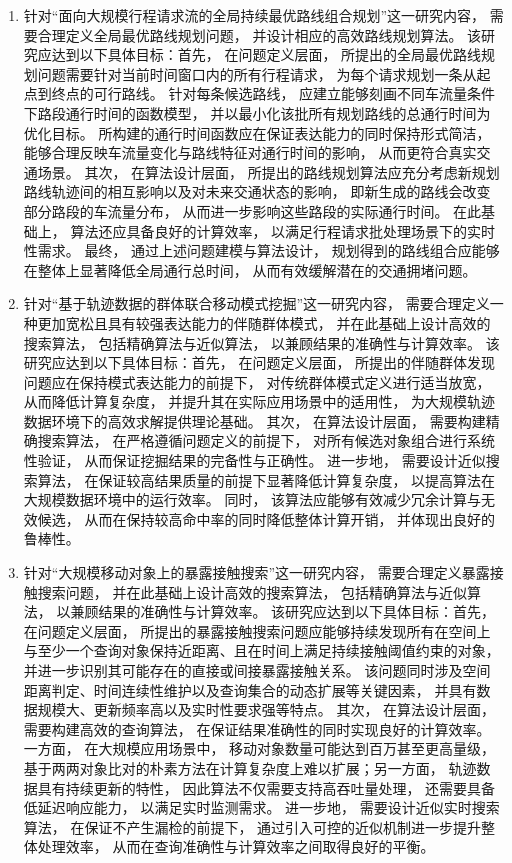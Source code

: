 \begin{enumerate}
    \item 针对“面向大规模行程请求流的全局持续最优路线组合规划”这一研究内容， 需要合理定义全局最优路线规划问题， 并设计相应的高效路线规划算法。 该研究应达到以下具体目标：首先， 在问题定义层面， 所提出的全局最优路线规划问题需要针对当前时间窗口内的所有行程请求， 为每个请求规划一条从起点到终点的可行路线。 针对每条候选路线， 应建立能够刻画不同车流量条件下路段通行时间的函数模型， 并以最小化该批所有规划路线的总通行时间为优化目标。 所构建的通行时间函数应在保证表达能力的同时保持形式简洁， 能够合理反映车流量变化与路线特征对通行时间的影响， 从而更符合真实交通场景。 其次， 在算法设计层面， 所提出的路线规划算法应充分考虑新规划路线轨迹间的相互影响以及对未来交通状态的影响， 即新生成的路线会改变部分路段的车流量分布， 从而进一步影响这些路段的实际通行时间。 在此基础上， 算法还应具备良好的计算效率， 以满足行程请求批处理场景下的实时性需求。 最终， 通过上述问题建模与算法设计， 规划得到的路线组合应能够在整体上显著降低全局通行总时间， 从而有效缓解潜在的交通拥堵问题。

    \item 针对“基于轨迹数据的群体联合移动模式挖掘”这一研究内容， 需要合理定义一种更加宽松且具有较强表达能力的伴随群体模式， 并在此基础上设计高效的搜索算法， 包括精确算法与近似算法， 以兼顾结果的准确性与计算效率。 该研究应达到以下具体目标：首先， 在问题定义层面， 所提出的伴随群体发现问题应在保持模式表达能力的前提下， 对传统群体模式定义进行适当放宽， 从而降低计算复杂度， 并提升其在实际应用场景中的适用性， 为大规模轨迹数据环境下的高效求解提供理论基础。 其次， 在算法设计层面， 需要构建精确搜索算法， 在严格遵循问题定义的前提下， 对所有候选对象组合进行系统性验证， 从而保证挖掘结果的完备性与正确性。 进一步地， 需要设计近似搜索算法， 在保证较高结果质量的前提下显著降低计算复杂度， 以提高算法在大规模数据环境中的运行效率。 同时， 该算法应能够有效减少冗余计算与无效候选， 从而在保持较高命中率的同时降低整体计算开销， 并体现出良好的鲁棒性。

    \item 针对“大规模移动对象上的暴露接触搜索”这一研究内容， 需要合理定义暴露接触搜索问题， 并在此基础上设计高效的搜索算法， 包括精确算法与近似算法， 以兼顾结果的准确性与计算效率。 该研究应达到以下具体目标：首先， 在问题定义层面， 所提出的暴露接触搜索问题应能够持续发现所有在空间上与至少一个查询对象保持近距离、且在时间上满足持续接触阈值约束的对象， 并进一步识别其可能存在的直接或间接暴露接触关系。 该问题同时涉及空间距离判定、时间连续性维护以及查询集合的动态扩展等关键因素， 并具有数据规模大、更新频率高以及实时性要求强等特点。 其次， 在算法设计层面， 需要构建高效的查询算法， 在保证结果准确性的同时实现良好的计算效率。 一方面， 在大规模应用场景中， 移动对象数量可能达到百万甚至更高量级， 基于两两对象比对的朴素方法在计算复杂度上难以扩展；另一方面， 轨迹数据具有持续更新的特性， 因此算法不仅需要支持高吞吐量处理， 还需要具备低延迟响应能力， 以满足实时监测需求。 进一步地， 需要设计近似实时搜索算法， 在保证不产生漏检的前提下， 通过引入可控的近似机制进一步提升整体处理效率， 从而在查询准确性与计算效率之间取得良好的平衡。



\end{enumerate}
